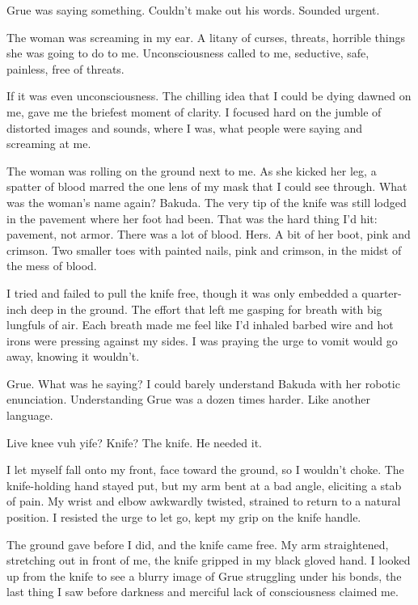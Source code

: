 Grue was saying something.  Couldn't make out his words.  Sounded urgent.



The woman was screaming in my ear.  A litany of curses, threats, horrible things she was going to do to me.  Unconsciousness called to me, seductive, safe, painless, free of threats.



If it was even unconsciousness. The chilling idea that I could be dying dawned on me, gave me the briefest moment of clarity.  I focused hard on the jumble of distorted images and sounds, where I was, what people were saying and screaming at me.



The woman was rolling on the ground next to me.  As she kicked her leg, a spatter of blood marred the one lens of my mask that I could see through.  What was the woman's name again?  Bakuda.  The very tip of the knife was still lodged in the pavement where her foot had been.  That was the hard thing I'd hit: pavement, not armor.  There was a lot of blood.  Hers.  A bit of her boot, pink and crimson.  Two smaller toes with painted nails, pink and crimson, in the midst of the mess of blood.



I tried and failed to pull the knife free, though it was only embedded a quarter-inch deep in the ground.  The effort that left me gasping for breath with big lungfuls of air.  Each breath made me feel like I'd inhaled barbed wire and hot irons were pressing against my sides.  I was praying the urge to vomit would go away, knowing it wouldn't.



Grue.  What was he saying?  I could barely understand Bakuda with her robotic enunciation.  Understanding Grue was a dozen times harder.  Like another language.



Live knee vuh yife?  Knife?  The knife.  He needed it.



I let myself fall onto my front, face toward the ground, so I wouldn't choke.  The knife-holding hand stayed put, but my arm bent at a bad angle, eliciting a stab of pain.  My wrist and elbow awkwardly twisted, strained to return to a natural position.  I resisted the urge to let go, kept my grip on the knife handle.



The ground gave before I did, and the knife came free.  My arm straightened, stretching out in front of me, the knife gripped in my black gloved hand.  I looked up from the knife to see a blurry image of Grue struggling under his bonds, the last thing I saw before darkness and merciful lack of consciousness claimed me.





